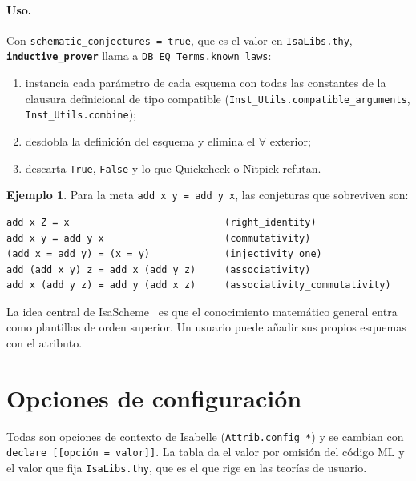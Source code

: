 \documentclass[11pt,a4paper]{article}
\newcommand{\isa}[1]{\texttt{#1}}
\newcommand{\cmd}[1]{\textbf{\texttt{#1}}}
\theoremstyle{definition}
\newtheorem{ejemplo}[definicion]{Ejemplo}
\theoremstyle{remark}
\begin{document}
\paragraph{Uso.} Con \isa{schematic\_conjectures = true}, que es el valor en
\isa{IsaLibs.thy}, \cmd{inductive\_prover} llama a \isa{DB\_EQ\_Terms.known\_laws}:
\begin{enumerate}[nosep]
  \item instancia cada parámetro de cada esquema con todas las constantes de la
        clausura definicional de tipo compatible
        (\isa{Inst\_Utils.compatible\_arguments}, \isa{Inst\_Utils.combine});
  \item desdobla la definición del esquema y elimina el $\forall$ exterior;
  \item descarta \isa{True}, \isa{False} y lo que Quickcheck o Nitpick refutan.
\end{enumerate}
\begin{ejemplo}
Para la meta \isa{add x y = add y x}, las conjeturas que sobreviven son:
\begin{lstlisting}
add x Z = x                           (right_identity)
add x y = add y x                     (commutativity)
(add x = add y) = (x = y)             (injectivity_one)
add (add x y) z = add x (add y z)     (associativity)
add x (add y z) = add y (add x z)     (associativity_commutativity)
\end{lstlisting}
\end{ejemplo}
La idea central de IsaScheme~\cite{montano2012} es que el conocimiento matemático
general entra como plantillas de orden superior. Un usuario puede añadir sus propios
esquemas con el atributo.

\section{Opciones de configuración}

Todas son opciones de contexto de Isabelle (\isa{Attrib.config\_*}) y se cambian con
\isa{declare [[opción = valor]]}. La tabla da el valor por omisión del código ML y
el valor que fija \isa{IsaLibs.thy}, que es el que rige en las teorías de usuario.
\end{document}
